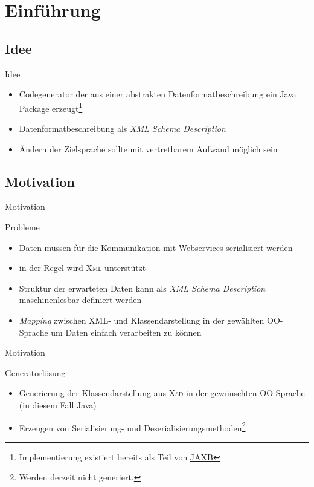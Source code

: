 \section{Einführung}

\subsection{Idee}
\begin{frame}{Idee}
    \begin{itemize}
        \item Codegenerator der aus einer abstrakten Datenformatbeschreibung ein Java Package erzeugt\footnote{Implementierung existiert bereits als Teil von \href{https://jaxb.java.net/}{JAXB}}
        \item Datenformatbeschreibung als \emph{XML Schema Description}
        \item Ändern der Zielsprache sollte mit vertretbarem Aufwand möglich sein
    \end{itemize}
\end{frame}

\subsection{Motivation}
\begin{frame}[squeeze]{Motivation}
    \begin{block}{Probleme}
        \begin{itemize}
            \item Daten müssen für die Kommunikation mit Webservices serialisiert werden
            \item in der Regel wird \textsc{Xml} unterstützt
            \item Struktur der erwarteten Daten kann als \emph{XML Schema Description} maschinenlesbar definiert werden
            \item \emph{Mapping} zwischen XML- und Klassendarstellung in der gewählten OO-Sprache um Daten einfach verarbeiten zu können
        \end{itemize}
    \end{block}
\end{frame}

\begin{frame}{Motivation}
    \begin{block}{Generatorlösung}
        \begin{itemize}
            \item Generierung der Klassendarstellung aus \textsc{Xsd} in der gewünschten OO-Sprache (in diesem Fall Java)
            \item Erzeugen von Serialisierung- und Deserialisierungsmethoden\footnote{Werden derzeit nicht generiert.}
        \end{itemize}
    \end{block}
\end{frame}


